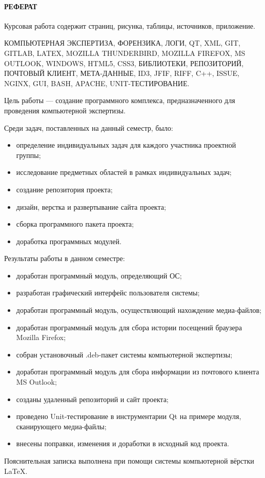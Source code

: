\newpage
{}
\paragraph{\hfill РЕФЕРАТ \hfill}
Курсовая работа содержит  страниц,  рисунка,  таблицы,  источников,  приложение.

КОМПЬЮТЕРНАЯ ЭКСПЕРТИЗА, ФОРЕНЗИКА, ЛОГИ, QT, XML, GIT, GITLAB, LATEX, MOZILLA THUNDERBIRD, MOZILLA FIREFOX, MS OUTLOOK, WINDOWS, HTML5, CSS3, БИБЛИОТЕКИ, РЕПОЗИТОРИЙ, ПОЧТОВЫЙ КЛИЕНТ, МЕТА-ДАННЫЕ, ID3, JFIF, RIFF, C++, ISSUE, NGINX, GUI, BASH, APACHE, UNIT-ТЕСТИРОВАНИЕ.

Цель работы --- создание программного комплекса, предназначенного для проведения компьютерной экспертизы.

Среди задач, поставленных на данный семестр, было: 
\begin{itemize}
  \item определение индивидуальных задач для каждого участника проектной группы;
  \item исследование предметных областей в рамках индивидуальных задач; 
  \item создание репозитория проекта;
  \item дизайн, верстка и развертывание сайта проекта;
  \item сборка программного пакета проекта;   
  \item доработка программных модулей.
\end{itemize}

Результаты работы в данном семестре:

\begin{itemize}
  \item доработан программный модуль, определяющий ОС;
  \item разработан графический интерфейс пользователя системы;
  \item доработан программный модуль, осуществляющий нахождение медиа-файлов;
  \item доработан программный модуль для сбора истории посещений браузера Mozilla Firefox;    
  \item собран установочный .deb-пакет системы компьютерной экспертизы;
  \item доработан программный модуль для сбора информации из почтового клиента MS Outlook;
  \item созданы удаленный репозиторий и сайт проекта;  
  \item проведено Unit-тестирование в инструментарии Qt на примере модуля, сканирующего медиа-файлы;
  \item внесены поправки, изменения и доработки в исходный код проекта.
\end{itemize}

Пояснительная записка выполнена при помощи системы компьютерной вёрстки \LaTeX.
